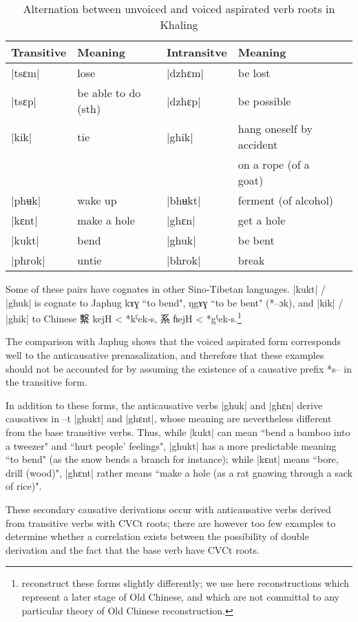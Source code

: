 \documentclass[oldfontcommands,oneside,a4paper,11pt]{article}
\newcommand{\ipa}[1]{{\phon #1}} %
\newcommand{\zh}[1]{{\cn #1}}
\begin{document}
\begin{table}[H]
\caption{Alternation between unvoiced and voiced aspirated verb roots in Khaling} \label{tab:anticaus}
\begin{tabular}{lllll}
\toprule
Transitive & Meaning &Intransitve& Meaning \\
\midrule
|tsɛm| & lose & |dzhɛm| &be lost \\
|tsɛp| & be able to do (sth) & |dzhɛp| &be possible \\
|kik| & tie & |ghik| &  hang oneself by accident\\
&&& on a rope (of a goat) \\
|phʉk| & wake up & |bhʉkt| &ferment (of alcohol) \\
\midrule
|kɛnt| & make a hole & |ghɛn| &get a hole \\
|kukt| & bend & |ghuk| &be bent\\
\midrule
|phrok| & untie & |bhrok| &break \\
\bottomrule
\end{tabular}
\end{table}
Some of these pairs have cognates in other Sino-Tibetan languages. |kukt| / |ghuk| is cognate to Japhug \ipa{kɤɣ} ``to bend", \ipa{ŋgɤɣ} ``to be bent" (*--ɔk), and |kik| / |ghik| to Chinese \zh{繫} kejH < *kˁek-s, \zh{系} ɦejH < *gˁek-s.\footnote{\citet{bs13oc} reconstruct these forms slightly differently; we use here  reconstructions which represent  a later stage of Old Chinese, and which are not committal to any particular theory of Old Chinese reconstruction.}

The comparison with Japhug shows that the voiced aspirated form corresponds well to the anticausative prenasalization, and therefore that these examples should not be accounted for by assuming the existence of a causative prefix *s-- in the transitive form.

In addition to these forms, the anticausative verbs |ghuk| and |ghɛn| derive causatives in \ipa{--t} |ghukt| and |ghɛnt|, whose meaning are nevertheless different from the base transitive verbs. Thus, while |kukt| can mean ``bend a bamboo into a tweezer" and ``hurt people' feelings", |ghukt| has a more predictable meaning ``to bend" (as the snow bends a branch for instance); while |kɛnt| means ``bore, drill (wood)", |ghɛnt| rather means ``make a hole (as a rat gnawing through a sack of rice)".

These secondary causative derivations occur with anticausative verbs derived from transitive verbs with CVCt roots; there are however too few examples to determine whether a correlation exists between the possibility of double derivation and the fact that the base verb have CVCt roots.
\end{document}
